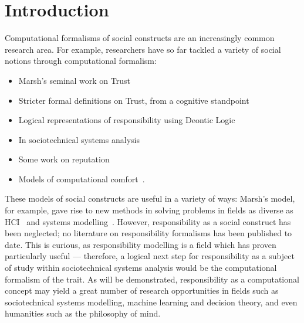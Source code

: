 \section{Introduction}\label{sec:intro}

Computational formalisms of social constructs are an increasingly common research area. For example, researchers have so far tackled a variety of social notions through computational formalism:

\begin{itemize}
    \item Marsh's seminal work on Trust~\cite{Marsh1994FormalisingConcept}
    
    \item Stricter formal definitions on Trust, from a cognitive standpoint~\cite{CastelfranchiSocialApproach}
    
    \item Logical representations of responsibility using Deontic Logic~\cite{deontic-logic}
        
    \item In sociotechnical systems analysis~\cite{Simpson2015FormalisingAnalysis}
    
    \item Some work on reputation~\cite{Chandrasekaran2011ASystems}

    \item Models of computational comfort~\cite{Marsh2011}.
    
\end{itemize}

These models of social constructs are useful in a variety of ways: Marsh's model, for example, gave rise to new methods in solving problems in fields as diverse as HCI~\cite{designing_with_trust} and systems modelling~\cite{Huynh2006}. However, responsibility as a social construct has been neglected; no literature on responsibility formalisms has been published to date. This is curious, as responsibility modelling is a field which has proven particularly useful --- therefore, a logical next step for responsibility as a subject of study within sociotechnical systems analysis would be the computational formalism of the trait. As will be demonstrated, responsibility as a computational concept may yield a great number of research opportunities in fields such as sociotechnical systems modelling, machine learning and decision theory, and even humanities such as the philosophy of mind.

